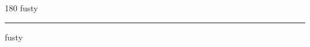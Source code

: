 
\begin{frame}
\begin{center}
\begin{turn}{180}
{\fontsize{2.5cm}{1em}\selectfont fusty}
\end{turn}
\vspace{1em}\par  
\hrule
\vspace{1em}\par  
{\fontsize{2.5cm}{1em}\selectfont fusty}
\end{center}
\end{frame}
